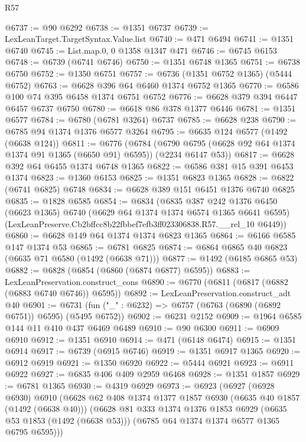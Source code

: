 \begin{lexlean}{R57}
\begin{coremodule}
@6737 := @90 @6292
@6738 := @1351 @6737
@6739 := LexLeanTarget.TargetSyntax.Value.list
@6740 := @471 @6494
@6741 := @1351 @6740
@6745 := List.map.{0, 0} @1358 @1347 @471
@6746 := @6745 @6153
@6748 := @6739 (@6741 @6746)
@6750 := @1351 @6748 @1365
@6751 := @6738 @6750
@6752 := @1350 @6751
@6757 := @6736 (@1351 @6752 @1365) (@5444 @6752)
@6763 := @6628 @396 @64 @6460 @1374 @6752 @1365
@6770 := @6586 @100 @74 @395 @6458 @1374 @6751 @6752
@6776 := @6628 @379 @394 @6447 @6457 @6737 @6750
@6780 := @6618 @86 @378 @1377 @6446
@6781 := @1351 @6577
@6784 := @6780 (@6781 @3264) @6737
@6785 := @6628 @238
@6790 := @6785 @94 @1374 @1376 @6577 @3264
@6795 := @6635 @124 @6577 (@1492 (@6638 @124))
@6811 := @6776
    (@6784 (@6790 @6795 (@6628 @92 @64 @1374 @1374 @91 @1365 (@6650 @91) @6595)) (@2234 @6147 @53))
@6817 := @6628 @392 @64 @6455 @1374 @6748 @1365
@6822 := @6586 @381 @15 @391 @6453 @1374
@6823 := @1360 @6153
@6825 := @1351 @6823 @1365
@6828 := @6822 (@6741 @6825) @6748
@6834 := @6628 @389 @151 @6451 @1376 @6740 @6825
@6835 := @1828 @6585
@6854 := @6834
    (@6835
      @387
      @242
      @1376
      @6450
      (@6623 @1365)
      @6740
      (@6629 @64 @1374 @1374 @6574 @1365 @6641 @6595)
      (LexLeanPreserve.Cb2bffcc8b22fbbef7efb3ff023306838.R57.__rel_10 @6449))
@6860 := @6628 @149 @64 @1374 @1374 @6823 @1365
@6864 := @6166 @6585 @147 @1374 @53
@6865 := @6781 @6825
@6874 := @6864 @6865 @40 @6823 (@6635 @71 @6580 (@1492 (@6638 @71)))
@6877 := @1492 (@6185 @6865 @53)
@6882 := @6828 (@6854 (@6860 (@6874 @6877) @6595))
@6883 := LexLeanPreservation.construct_cons
@6890 := @6770 (@6811 (@6817 (@6882 (@6883 @6740 @6746)) @6595))
@6892 := LexLeanPreservation.construct_adt @40
@6901 := @6731 (fun ("_" : @6232) => @6757 (@6763 (@6890 (@6892 @6751)) @6595) (@5495 @6752))
@6902 := @6231 @2152
@6909 := @1964 @6585 @144 @11 @410 @437 @6469 @6489
@6910 := @90 @6300
@6911 := @6909 @6910
@6912 := @1351 @6910
@6914 := @471 (@6148 @6474)
@6915 := @1351 @6914
@6917 := @6739 (@6915 @6746)
@6919 := @1351 @6917 @1365
@6920 := @6912 @6919
@6921 := @1350 @6920
@6922 := @5444 @6921
@6923 := @6911 @6922
@6927 := @6835 @406 @409 @2959 @6468
@6928 := @1351 @1857
@6929 := @6781 @1365
@6930 := @4319 @6929
@6973 := @6923
    (@6927
      (@6928 @6930)
      @6910
      (@6628
        @62
        @408
        @1374
        @1377
        @1857
        @6930
        (@6635 @40 @1857 (@1492 (@6638 @40)))
        (@6628
          @81
          @333
          @1374
          @1376
          @1853
          @6929
          (@6635 @53 @1853 (@1492 (@6638 @53)))
          (@6785 @64 @1374 @1374 @6577 @1365 @6795 @6595)))

\end{coremodule}
\end{lexlean}
